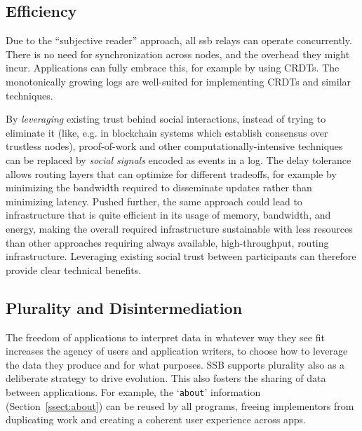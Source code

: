 \documentclass[10pt,sigconf,rewiew]{acmart}
\begin{document}



\subsection{Efficiency}

Due to the ``subjective reader'' approach, all ssb relays can operate concurrently. There is no need for synchronization across nodes, and the overhead they might incur. Applications can fully embrace this, for example by using CRDTs. The monotonically growing logs are well-suited for implementing CRDTs and similar techniques.

By {\em leveraging} existing trust behind social interactions, instead of trying to eliminate it (like, e.g. in blockchain systems which establish consensus over trustless nodes), proof-of-work and other computationally-intensive techniques can be replaced by \textit{social signals} encoded as events in a log. The delay tolerance allows routing layers that can optimize for different tradeoffs, for example by minimizing the bandwidth required to disseminate updates rather than minimizing latency. Pushed further, the same approach could lead to infrastructure that is quite efficient in its usage of memory, bandwidth, and energy, making the overall required infrastructure sustainable with less resources than other approaches requiring always available, high-throughput, routing infrastructure. Leveraging existing social trust between participants can therefore provide clear technical benefits.

\subsection{Plurality and Disintermediation}


The freedom of applications to interpret data in whatever way they see fit increases the agency of users and application writers, to choose how to leverage the data they produce and for what purposes. SSB supports plurality also as a deliberate strategy to drive evolution. This also fosters the sharing of data between applications. For example, the `{\small\tt about}' information (Section~\ref{ssect:about}) can be reused by all programs, freeing implementors from duplicating work and creating a coherent user experience across apps.
\end{document}
